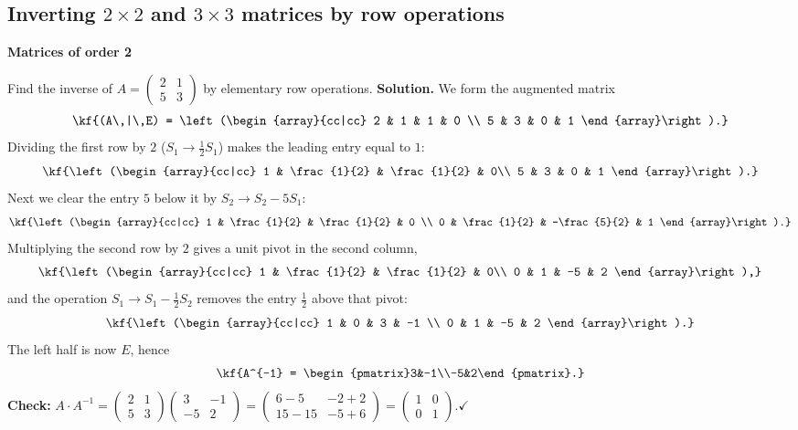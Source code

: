 \subsection{Inverting $2\times2$ and $3\times3$ matrices by row operations}
\textbf{Matrices of order 2}
\begin{misol}
Find the inverse of $A=\begin{pmatrix}2&1\\5&3\end{pmatrix}$ by elementary row
operations.
\textbf{Solution.} We form the augmented matrix
\[\kf{(A\,|\,E) = \left(\begin{array}{cc|cc}
2 & 1 & 1 & 0 \\
5 & 3 & 0 & 1
\end{array}\right).}\]
Dividing the first row by $2$ ($S_1 \to \frac{1}{2}S_1$) makes the leading entry
equal to $1$:
\[\kf{\left(\begin{array}{cc|cc}
1 & \frac{1}{2} & \frac{1}{2} & 0\\
5 & 3 & 0 & 1
\end{array}\right).}\]
Next we clear the entry $5$ below it by $S_2 \to S_2-5S_1$:
\[\kf{\left(\begin{array}{cc|cc}
1 & \frac{1}{2} & \frac{1}{2} & 0 \\
0 & \frac{1}{2} & -\frac{5}{2} & 1
\end{array}\right).}\]
Multiplying the second row by $2$ gives a unit pivot in the second column,
\[\kf{\left(\begin{array}{cc|cc}
1 & \frac{1}{2} & \frac{1}{2} & 0\\
0 & 1 & -5 & 2
\end{array}\right),}\]
and the operation $S_1 \to S_1 - \frac{1}{2}S_2$ removes the entry
$\frac{1}{2}$ above that pivot:
\[\kf{\left(\begin{array}{cc|cc}
1 & 0 & 3 & -1 \\
0 & 1 & -5 & 2
\end{array}\right).}\]
The left half is now $E$, hence
\[\kf{A^{-1} = \begin{pmatrix}3&-1\\-5&2\end{pmatrix}.}\]
\textbf{Check:}
$A\cdot A^{-1} = \begin{pmatrix}2&1\\5&3\end{pmatrix}\begin{pmatrix}3&-1\\-5&2\end{pmatrix}
= \begin{pmatrix}6-5&-2+2\\15-15&-5+6\end{pmatrix}
= \begin{pmatrix}1&0\\0&1\end{pmatrix}. \checkmark$
\end{misol}
